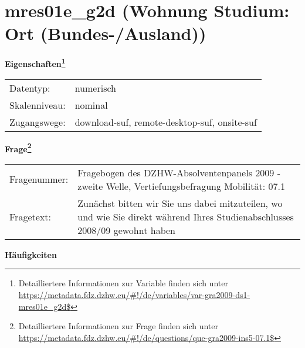 
    \setcounter{footnote}{0}

    \vspace*{-1.8cm}
	\section{mres01e\_g2d (Wohnung Studium: Ort (Bundes-/Ausland))}
	\label{section:mres01e_g2d}



    \vspace*{0.5cm}
    \noindent\textbf{Eigenschaften\footnote{Detailliertere Informationen zur Variable finden sich unter
		\url{https://metadata.fdz.dzhw.eu/\#!/de/variables/var-gra2009-ds1-mres01e_g2d$}}}\\
	\begin{tabularx}{\hsize}{@{}lX}
	Datentyp: & numerisch \\
	Skalenniveau: & nominal \\
	Zugangswege: &
	  download-suf, 
	  remote-desktop-suf, 
	  onsite-suf
 \\
    \end{tabularx}



				\vspace*{0.5cm}
                \noindent\textbf{Frage\footnote{Detailliertere Informationen zur Frage finden sich unter
		              \url{https://metadata.fdz.dzhw.eu/\#!/de/questions/que-gra2009-ins5-07.1$}}}\\
				\begin{tabularx}{\hsize}{@{}lX}
					Fragenummer: &
					  Fragebogen des DZHW-Absolventenpanels 2009 - zweite Welle, Vertiefungsbefragung Mobilität:
					  07.1
 \\
					Fragetext: & Zunächst bitten wir Sie uns dabei mitzuteilen, wo und wie Sie direkt während Ihres Studienabschlusses 2008/09 gewohnt haben \\
				\end{tabularx}





        		\vspace*{0.5cm}
                \noindent\textbf{Häufigkeiten}

